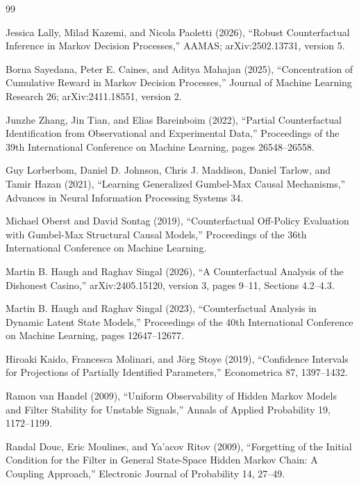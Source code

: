 \documentclass{article}
\begin{document}
\begin{thebibliography}{99}

   Jessica Lally, Milad Kazemi, and Nicola Paoletti (2026), ``Robust Counterfactual Inference in Markov Decision Processes,'' AAMAS; arXiv:2502.13731, version 5.

   Borna Sayedana, Peter E. Caines, and Aditya Mahajan (2025), ``Concentration of Cumulative Reward in Markov Decision Processes,'' Journal of Machine Learning Research 26; arXiv:2411.18551, version 2.

   Junzhe Zhang, Jin Tian, and Elias Bareinboim (2022), ``Partial Counterfactual Identification from Observational and Experimental Data,'' Proceedings of the 39th International Conference on Machine Learning, pages 26548--26558.

   Guy Lorberbom, Daniel D. Johnson, Chris J. Maddison, Daniel Tarlow, and Tamir Hazan (2021), ``Learning Generalized Gumbel-Max Causal Mechanisms,'' Advances in Neural Information Processing Systems 34.

   Michael Oberst and David Sontag (2019), ``Counterfactual Off-Policy Evaluation with Gumbel-Max Structural Causal Models,'' Proceedings of the 36th International Conference on Machine Learning.

   Martin B. Haugh and Raghav Singal (2026), ``A Counterfactual Analysis of the Dishonest Casino,'' arXiv:2405.15120, version 3, pages 9--11, Sections 4.2--4.3.

   Martin B. Haugh and Raghav Singal (2023), ``Counterfactual Analysis in Dynamic Latent State Models,'' Proceedings of the 40th International Conference on Machine Learning, pages 12647--12677.

   Hiroaki Kaido, Francesca Molinari, and Jörg Stoye (2019), ``Confidence Intervals for Projections of Partially Identified Parameters,'' Econometrica 87, 1397--1432.

   Ramon van Handel (2009), ``Uniform Observability of Hidden Markov Models and Filter Stability for Unstable Signals,'' Annals of Applied Probability 19, 1172--1199.

   Randal Douc, Eric Moulines, and Ya'acov Ritov (2009), ``Forgetting of the Initial Condition for the Filter in General State-Space Hidden Markov Chain: A Coupling Approach,'' Electronic Journal of Probability 14, 27--49.


\end{thebibliography}
\end{document}
